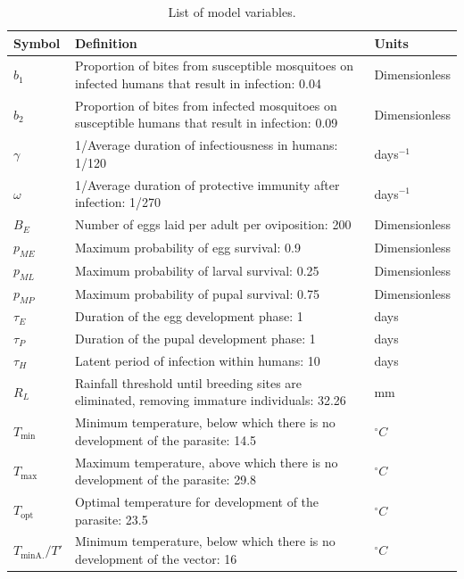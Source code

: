 \documentclass[a4paper,fleqn]{cas-dc}
\begin{document}
\clearpage
\begin{table}[width=2.0\linewidth,cols=3,pos=h]
\begin{threeparttable}
\caption{List of model variables.}\label{tbl2}
\renewcommand{\thetable}{A.2}
\begin{tabular*}{\tblwidth}{@{} LLL@{} }
\toprule
Symbol & Definition & Units \\
\midrule
$b_1$  & Proportion of bites from susceptible mosquitoes on infected humans that result in infection: 0.04 & Dimensionless \\
$b_2$   & Proportion of bites from infected mosquitoes on susceptible humans that result in infection: 0.09 & Dimensionless \\
$\gamma$ &  1/Average duration of infectiousness in humans: 1/120 & days$^{-1}$  \\
$\omega$ & 1/Average duration of protective immunity after infection: 1/270 & days$^{-1}$  \\
$B_E$  & Number of eggs laid per adult per oviposition: 200 & Dimensionless \\ 
$p_{ME}$  & Maximum probability of egg survival: 0.9 & Dimensionless \\ 
$p_{ML}$  & Maximum probability of larval survival: 0.25 & Dimensionless \\ 
$p_{MP}$  & Maximum probability of pupal survival: 0.75 & Dimensionless \\ 
$\tau_E$  & Duration of the egg development phase: 1 & days \\ 
$\tau_P$  & Duration of the pupal development phase: 1 & days \\ 
$\tau_H$  & Latent period of infection within humans: 10 & days \\ 
$R_L$  & Rainfall threshold until breeding sites are eliminated, removing immature individuals: 32.26   & mm \\ 
$T_{\min}$  & Minimum temperature, below which there is no development of the parasite: 14.5 & $^\circ C$ \\ 
$T_{\max}$  & Maximum temperature, above which there is no development of the parasite: 29.8 \cite{McCord2016} &  $^\circ C$ \\
$T_{\mathrm{opt}}$ & Optimal temperature for development of the parasite: 23.5 \cite{McCord2016} &  $^\circ C$ \\
$T_{\min\text{A.}}/T'$ & Minimum temperature, below which there is no development of the vector: 16   \cite{brierre_function_development_rate, climate_based_distribution_sub_sahara} & $^\circ C$ \\

\end{tabular*}
\end{threeparttable}
\end{table}
\end{document}
